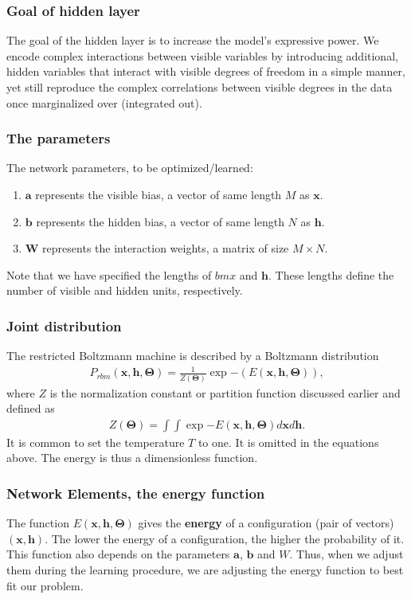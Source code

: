 \documentclass{beamer}
\begin{document}
\begin{frame}
\frametitle{Goal of hidden layer}

The goal of the hidden layer is to increase the model's expressive
power. We encode complex interactions between visible variables by
introducing additional, hidden variables that interact with visible
degrees of freedom in a simple manner, yet still reproduce the complex
correlations between visible degrees in the data once marginalized
over (integrated out).
\end{frame}

\begin{frame}
\frametitle{The parameters}

The network parameters, to be optimized/learned:
\begin{enumerate}
\item $\bm{a}$ represents the visible bias, a vector of same length $M$ as $\bm{x}$.

\item $\bm{b}$ represents the hidden bias, a vector of same length $N$  as $\bm{h}$.

\item $\bm{W}$ represents the interaction weights, a matrix of size $M\times N$.
\end{enumerate}

\noindent
Note that we have specified the lengths of $bm{x}$ and $\bm{h}$. These
lengths define the number of visible and hidden units, respectively.
\end{frame}

\begin{frame}
\frametitle{Joint distribution}

The restricted Boltzmann machine is described by a Boltzmann distribution
\begin{align*}
	P_{rbm}(\bm{x},\bm{h},\bm{\Theta}) = \frac{1}{Z(\bm{\Theta})} \exp{-(E(\bm{x},\bm{h},\bm{\Theta}))},
\end{align*}
where $Z$ is the normalization constant or partition function discussed earlier and defined as 
\begin{align*}
	Z(\bm{\Theta}) = \int \int \exp{-E(\bm{x},\bm{h},\bm{\Theta})} d\bm{x} d\bm{h}.
\end{align*}
It is common to set  the temperature $T$ to one. It is omitted in the equations above. The energy is thus a dimensionless function.
\end{frame}

\begin{frame}
\frametitle{Network Elements, the energy function}

The function $E(\bm{x},\bm{h},\bm{\Theta})$ gives the \textbf{energy} of a
configuration (pair of vectors) $(\bm{x}, \bm{h})$. The lower
the energy of a configuration, the higher the probability of it. This
function also depends on the parameters $\bm{a}$, $\bm{b}$ and
$W$. Thus, when we adjust them during the learning procedure, we are
adjusting the energy function to best fit our problem.
\end{frame}
\end{document}
